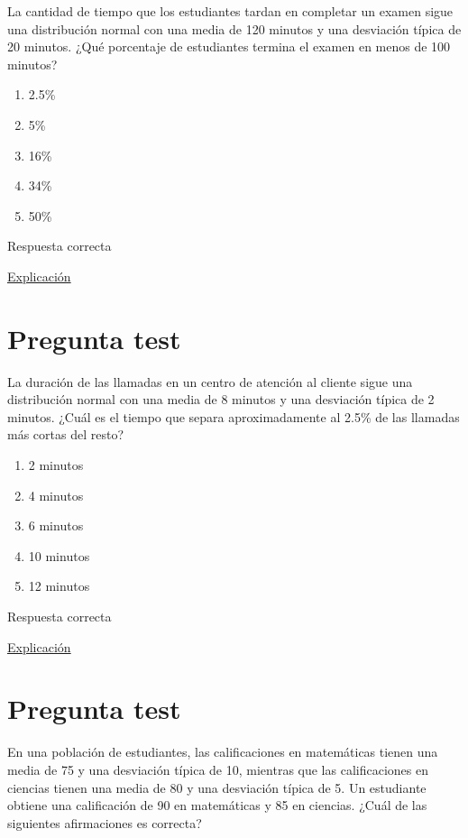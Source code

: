 \documentclass[
]{book}
\providecommand{\tightlist}{%
  \setlength{\itemsep}{0pt}\setlength{\parskip}{0pt}}
\begin{document}
La cantidad de tiempo que los estudiantes tardan en completar un examen sigue una distribución normal con una media de 120 minutos y una desviación típica de 20 minutos. ¿Qué porcentaje de estudiantes termina el examen en menos de 100 minutos?

\begin{enumerate}
\def\labelenumi{\alph{enumi})}
\tightlist
\item
  2.5\%
\item
  5\%
\item
  16\%
\item
  34\%
\item
  50\%
\end{enumerate}

Respuesta correcta

\href{https://homepage.divms.uiowa.edu/~mbognar/applets/normal.html}{Explicación}

\hypertarget{pregunta-test-104}{%
\section{Pregunta test}\label{pregunta-test-104}}

La duración de las llamadas en un centro de atención al cliente sigue una distribución normal con una media de 8 minutos y una desviación típica de 2 minutos. ¿Cuál es el tiempo que separa aproximadamente al 2.5\% de las llamadas más cortas del resto?

\begin{enumerate}
\def\labelenumi{\alph{enumi})}
\tightlist
\item
  2 minutos
\item
  4 minutos
\item
  6 minutos
\item
  10 minutos
\item
  12 minutos
\end{enumerate}

Respuesta correcta

\href{https://homepage.divms.uiowa.edu/~mbognar/applets/normal.html}{Explicación}

\hypertarget{pregunta-test-105}{%
\section{Pregunta test}\label{pregunta-test-105}}

En una población de estudiantes, las calificaciones en matemáticas tienen una media de 75 y una desviación típica de 10, mientras que las calificaciones en ciencias tienen una media de 80 y una desviación típica de 5. Un estudiante obtiene una calificación de 90 en matemáticas y 85 en ciencias. ¿Cuál de las siguientes afirmaciones es correcta?
\end{document}
